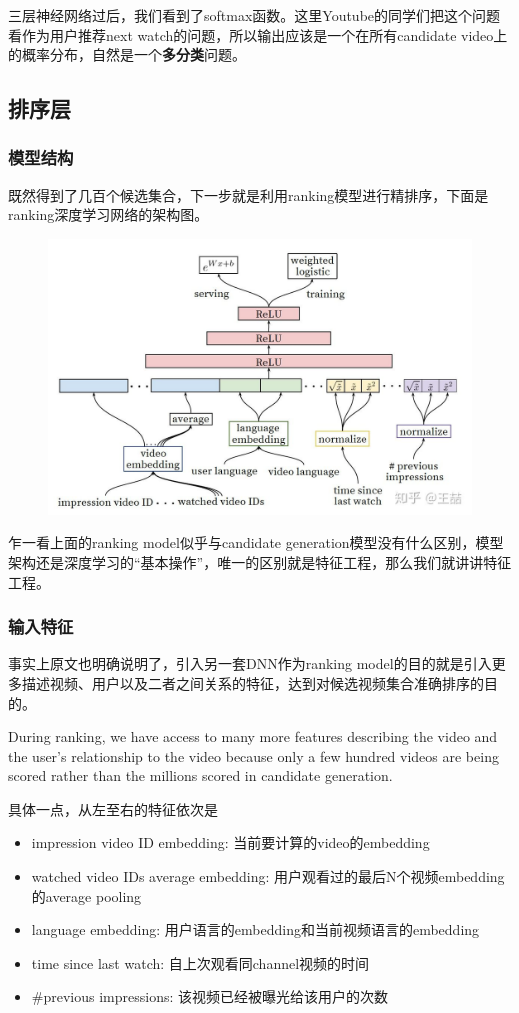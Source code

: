 \documentclass[12pt]{article}
\begin{document}
三层神经网络过后，我们看到了softmax函数。这里Youtube的同学们把这个问题看作为用户推荐next watch的问题，所以输出应该是一个在所有candidate video上的概率分布，自然是一个\textbf{多分类}问题。

\subsection{排序层}
\subsubsection{模型结构}
既然得到了几百个候选集合，下一步就是利用ranking模型进行精排序，下面是ranking深度学习网络的架构图。
\begin{figure}[H]
    \centering
    \includegraphics[width=.8\textwidth]{fig/Youtube_Ranking_Model.jpg}
\end{figure}

乍一看上面的ranking model似乎与candidate generation模型没有什么区别，模型架构还是深度学习的“基本操作”，唯一的区别就是特征工程，那么我们就讲讲特征工程。

\subsubsection{输入特征}
事实上原文也明确说明了，引入另一套DNN作为ranking model的目的就是引入更多描述视频、用户以及二者之间关系的特征，达到对候选视频集合准确排序的目的。

During ranking, we have access to many more features describing the video and the user's relationship to the video because only a few hundred videos are being scored rather than the millions scored in candidate generation.

具体一点，从左至右的特征依次是
\begin{itemize}
\setlength{\itemsep}{0pt}
\setlength{\parsep}{0pt}
\setlength{\parskip}{0pt}
    \item impression video ID embedding: 当前要计算的video的embedding
    \item watched video IDs average embedding: 用户观看过的最后N个视频embedding的average pooling
    \item language embedding: 用户语言的embedding和当前视频语言的embedding
    \item time since last watch: 自上次观看同channel视频的时间
    \item \#previous impressions: 该视频已经被曝光给该用户的次数
\end{itemize}
\end{document}
